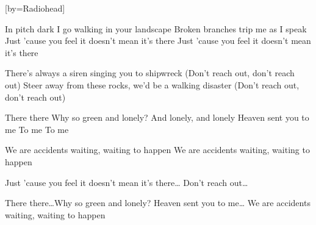 


[by=Radiohead]

\beginverse*
{\nolyrics Jam chart: \[Am] \[Em] \[F] \[C] \quad (Loop)}
\endverse

\beginverse
In pitch dark I go walking in your landscape
Broken branches trip me as I speak
Just 'cause you feel it doesn't mean it's there
Just 'cause you feel it doesn't mean it's there
\endverse

\beginverse
There's always a siren singing you to shipwreck
(Don't reach out, don't reach out)
Steer away from these rocks, we'd be a walking disaster
(Don't reach out, don't reach out)
\endverse

\beginchorus
There there \brk  Why so green and lonely?
And lonely, and lonely
Heaven sent you to me \brk  To me \brk  To me
\endchorus

\beginverse
We are accidents waiting, waiting to happen
We are accidents waiting, waiting to happen
\endverse

\beginverse
Just 'cause you feel it doesn't mean it's there\ldots
Don't reach out\ldots
\endverse

\beginchorus
{} There there\ldots Why so green and lonely?
Heaven sent you to me\ldots
We are accidents waiting, waiting to happen
\endchorus

\endsong
